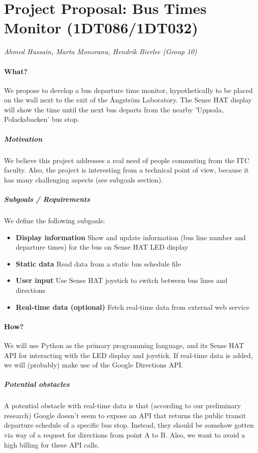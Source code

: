 \documentclass[oneside,a4paper]{paper}
\begin{document}
\pagestyle{empty}

\section*{Project Proposal: Bus Times Monitor (1DT086/1DT032)}

\emph{Ahmed Hussain, Marta Monoranu, Hendrik Bierlee (Group 10)}

\paragraph{What?} We propose to develop a bus departure time monitor, hypothetically to be placed on the wall next to the exit of the Ångström Laboratory.
The Sense HAT display will show the time until the next bus departs from the nearby 'Uppsala, Polacksbacken' bus stop.

\subparagraph{Motivation} We believe this project addresses a real need of people commuting from the ITC faculty.
Also, the project is interesting from a technical point of view, because it has many challenging aspects (see subgoals section).

\subparagraph{Subgoals / Requirements} We define the following subgoals:
\begin{itemize}
	\item \textbf{Display information} Show and update information (bus line number and departure times) for the bus on Sense HAT LED display
	\item \textbf{Static data} Read data from a static bus schedule file
	\item \textbf{User input} Use Sense HAT joystick to switch between bus lines and directions
	\item \textbf{Real-time data (optional)} Fetch real-time data from external web service
\end{itemize}
	
\paragraph{How?} We will use Python as the primary programming language, and its Sense HAT API for interacting with the LED display and joystick. If real-time data is added, we will (probably) make use of the Google Directions API.

\subparagraph{Potential obstacles} A potential obstacle with real-time data is that (according to our preliminary research) Google doesn't seem to expose an API that returns the public transit departure schedule of a specific bus stop.
Instead, they should be somehow gotten via way of a request for directions from point A to B.
Also, we want to avoid a high billing for these API calls.
\end{document}
